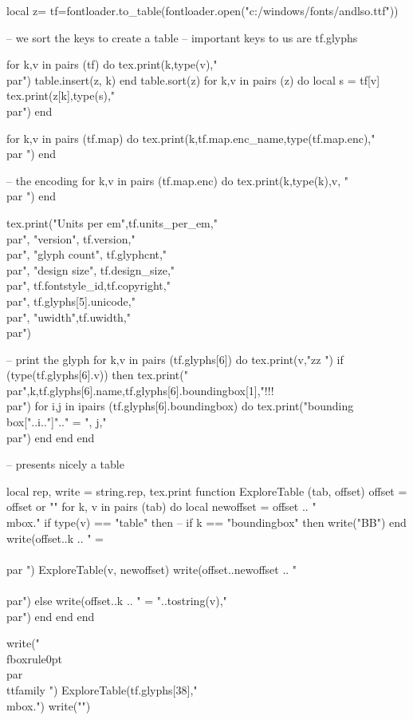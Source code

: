 \documentclass{article}
\begin{document}
\begin{luacode*}
local z={}
tf=fontloader.to_table(fontloader.open("c:/windows/fonts/andlso.ttf"))

-- we sort the keys to create a table
-- important keys to us are tf.glyphs

for k,v in pairs (tf) do
   tex.print(k,type(v),"\\par")
   table.insert(z, k)
end
table.sort(z)
for k,v in pairs (z) do
   local s = tf[v]
   tex.print(z[k],type(s),"\\par")
end

for k,v in pairs (tf.map) do
   tex.print(k,tf.map.enc_name,type(tf.map.enc),"\\par ")
end

-- the encoding
for k,v in pairs (tf.map.enc) do
   tex.print(k,type(k),v, "\\par ")
end

tex.print("Units per em",tf.units_per_em,"\\par",
          "version", tf.version,"\\par",
          "glyph count", tf.glyphcnt,"\\par",
          "design size", tf.design_size,"\\par",
           tf.fontstyle_id,tf.copyright,"\\par",
           tf.glyphs[5].unicode,"\\par", 
          "uwidth",tf.uwidth,"\\par")

-- print the glyph
for k,v in pairs (tf.glyphs[6]) do
    tex.print(v,"zz ")
    if (type(tf.glyphs[6].v)) then tex.print("\\par",k,tf.glyphs[6].name,tf.glyphs[6].boundingbox[1],"!!!\\par")  
      for i,j in ipairs (tf.glyphs[6].boundingbox) do
        tex.print("bounding box["..i.."]".." = ", j,"\\par")
      end 
    end
end




-- presents nicely a table 

local rep, write = string.rep, tex.print
function ExploreTable (tab, offset)
    offset = offset or ""
    for k, v in pairs (tab) do
        local newoffset = offset .. "\\mbox{.}"
        if type(v) == "table" then
           -- if k == "boundingbox" then write("BB") end
           write(offset..k .. " = \\{\\par ")
           ExploreTable(v, newoffset)
           write(offset..newoffset .. "\\}\\par")
         else
           write(offset..k .. " = "..tostring(v),"\\par")
         end
      end
end

write("\\fboxrule0pt\\par{\\ttfamily ")
 ExploreTable(tf.glyphs[38],"\\mbox{.}")
write("}")

\end{luacode*}
\end{document}
